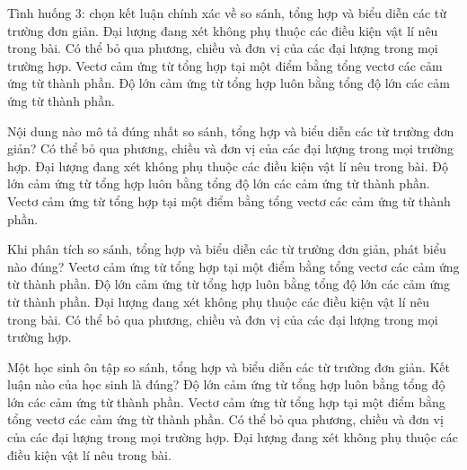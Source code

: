 \begin{ex}
Tình huống 3: chọn kết luận chính xác về so sánh, tổng hợp và biểu diễn các từ trường đơn giản.
\choice
{Đại lượng đang xét không phụ thuộc các điều kiện vật lí nêu trong bài.}
{Có thể bỏ qua phương, chiều và đơn vị của các đại lượng trong mọi trường hợp.}
{\True Vectơ cảm ứng từ tổng hợp tại một điểm bằng tổng vectơ các cảm ứng từ thành phần.}
{Độ lớn cảm ứng từ tổng hợp luôn bằng tổng độ lớn các cảm ứng từ thành phần.}
\end{ex}

\begin{ex}
Nội dung nào mô tả đúng nhất so sánh, tổng hợp và biểu diễn các từ trường đơn giản?
\choice
{Có thể bỏ qua phương, chiều và đơn vị của các đại lượng trong mọi trường hợp.}
{Đại lượng đang xét không phụ thuộc các điều kiện vật lí nêu trong bài.}
{Độ lớn cảm ứng từ tổng hợp luôn bằng tổng độ lớn các cảm ứng từ thành phần.}
{\True Vectơ cảm ứng từ tổng hợp tại một điểm bằng tổng vectơ các cảm ứng từ thành phần.}
\end{ex}

\begin{ex}
Khi phân tích so sánh, tổng hợp và biểu diễn các từ trường đơn giản, phát biểu nào đúng?
\choice
{\True Vectơ cảm ứng từ tổng hợp tại một điểm bằng tổng vectơ các cảm ứng từ thành phần.}
{Độ lớn cảm ứng từ tổng hợp luôn bằng tổng độ lớn các cảm ứng từ thành phần.}
{Đại lượng đang xét không phụ thuộc các điều kiện vật lí nêu trong bài.}
{Có thể bỏ qua phương, chiều và đơn vị của các đại lượng trong mọi trường hợp.}
\end{ex}

\begin{ex}
Một học sinh ôn tập so sánh, tổng hợp và biểu diễn các từ trường đơn giản. Kết luận nào của học sinh là đúng?
\choice
{Độ lớn cảm ứng từ tổng hợp luôn bằng tổng độ lớn các cảm ứng từ thành phần.}
{\True Vectơ cảm ứng từ tổng hợp tại một điểm bằng tổng vectơ các cảm ứng từ thành phần.}
{Có thể bỏ qua phương, chiều và đơn vị của các đại lượng trong mọi trường hợp.}
{Đại lượng đang xét không phụ thuộc các điều kiện vật lí nêu trong bài.}
\end{ex}

